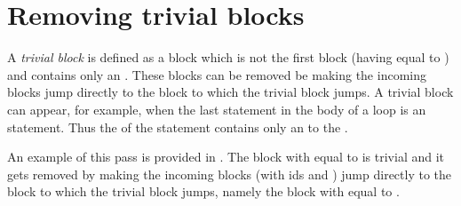 \section{Removing trivial blocks}

A \textit{trivial block} is defined as a block which is not the first block (having  equal to ) and
contains only an . These blocks can be removed be making the incoming blocks jump
directly to the block to which the trivial block jumps. A trivial block can appear, for example, when the last statement
in the body of a loop is an  statement. Thus the  of the  statement contains only an
 to the .

An example of this pass is provided in . The block with  equal to
 is trivial and it gets removed by making the incoming blocks (with ids  and ) jump directly to
the block to which the trivial block jumps, namely the block with  equal to .

